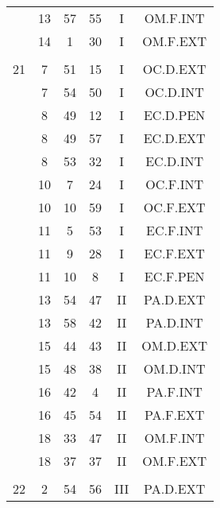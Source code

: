 \documentclass[12pt, a4paper]{article}
\begin{document}
\begin{multicols}{3}
{\begin{tabular}{c c c c c c}
	 	 	 	 & 13 & 57 & 55 & I & OM.F.INT\\%
	 	 	 	 & 14 & 1 & 30 & I & OM.F.EXT\\%
	 	 	 	 & & & & & \\%
	 	 	 	21 & 7 & 51 & 15 & I & OC.D.EXT\\%
	 	 	 	 & 7 & 54 & 50 & I & OC.D.INT\\%
	 	 	 	 & 8 & 49 & 12 & I & EC.D.PEN\\%
	 	 	 	 & 8 & 49 & 57 & I & EC.D.EXT\\%
	 	 	 	 & 8 & 53 & 32 & I & EC.D.INT\\%
	 	 	 	 & 10 & 7 & 24 & I & OC.F.INT\\%
	 	 	 	 & 10 & 10 & 59 & I & OC.F.EXT\\%
	 	 	 	 & 11 & 5 & 53 & I & EC.F.INT\\%
	 	 	 	 & 11 & 9 & 28 & I & EC.F.EXT\\%
	 	 	 	 & 11 & 10 & 8 & I & EC.F.PEN\\%
	 	 	 	 & 13 & 54 & 47 & II & PA.D.EXT\\%
	 	 	 	 & 13 & 58 & 42 & II & PA.D.INT\\%
	 	 	 	 & 15 & 44 & 43 & II & OM.D.EXT\\%
	 	 	 	 & 15 & 48 & 38 & II & OM.D.INT\\%
	 	 	 	 & 16 & 42 & 4 & II & PA.F.INT\\%
	 	 	 	 & 16 & 45 & 54 & II & PA.F.EXT\\%
	 	 	 	 & 18 & 33 & 47 & II & OM.F.INT\\%
	 	 	 	 & 18 & 37 & 37 & II & OM.F.EXT\\%
	 	 	 	 & & & & & \\%
	 	 	 	22 & 2 & 54 & 56 & III & PA.D.EXT\\%

\end{tabular}}
\end{multicols}
\end{document}
